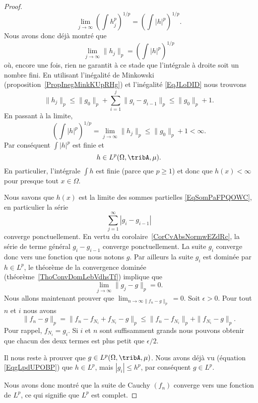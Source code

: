 \begin{proof}
	\begin{equation}
		\lim_{j\to \infty} \left( \int h_j^p \right)^{1/p}=\left( \int | h |^p \right)^{1/p}.
	\end{equation}
	Nous avons donc déjà montré que
	\begin{equation}
		\lim_{j\to \infty} \| h_j \|_p=\left( \int | h |^p \right)^{1/p}
	\end{equation}
	où, encore une fois, rien ne garantit à ce stade que l'intégrale à droite soit un nombre fini. En utilisant l'inégalité de Minkowski (proposition~\ref{PropInegMinkKUpRHg}) et l'inégalité \eqref{EqJLoDID} nous trouvons
	\begin{equation}
		\|h_j\|_p\leq \|g_0\|_p+\sum_{i=1}^j\|g_i-g_{i-1}\|_p\leq \|g_0\|_p+1.
	\end{equation}
	En passant à la limite,
	\begin{equation}
		\left( \int| h |^p \right)^{1/p}=\lim_{j\to \infty}\|h_j\|_p \leq \|g_0\|_p+1<\infty.
	\end{equation}
	Par conséquent \( \int| h |^p\) est finie et
	\begin{equation}    \label{EqgLpdUPOBP}
		h\in L^p(\Omega,\tribA,\mu).
	\end{equation}
	En particulier, l'intégrale \( \int h\) est finie (parce que \( p\geq 1\)) et donc que \( h(x)<\infty\) pour presque tout \( x\in\Omega\).

	Nous savons que \( h(x)\) est la limite des sommes partielles \eqref{EqSomPaFPQOWC}, en particulier la série
	\begin{equation}
		\sum_{j=1}^{\infty}| g_i-g_{i-1} |
	\end{equation}
	converge ponctuellement. En vertu du corolaire~\ref{CorCvAbsNormwEZdRc}, la série de terme général \( g_i-g_{i-1}\) converge ponctuellement. La suite \( g_i\) converge donc vers une fonction que nous notons \( g\). Par ailleurs la suite \( g_i\) est dominée par \( h\in L^p\), le théorème de la convergence dominée (théorème~\ref{ThoConvDomLebVdhsTf}) implique que
	\begin{equation}
		\lim_{j\to \infty} \|g_j-g\|_p=0.
	\end{equation}
	Nous allons maintenant prouver que \( \lim_{n\to \infty\|f_n-g\|_p} =0\). Soit \( \epsilon>0\). Pour tout \( n\) et \( i\) nous avons
	\begin{equation}
		\|f_n-g\|_p=\|f_n-f_{N_i}+f_{N_i}-g\|_p\leq\|f_n-f_{N_i}\|_p+\|f_{N_i}-g\|_p.
	\end{equation}
	Pour rappel, \( f_{N_i}=g_i\). Si \(i\) et \( n\) sont suffisamment grands nous pouvons obtenir que chacun des deux termes est plus petit que \( \epsilon/2\).

	Il nous reste à prouver que \( g\in L^p(\Omega,\tribA,\mu)\). Nous avons déjà vu (équation \eqref{EqgLpdUPOBP}) que \( h\in L^p\), mais \( | g_i |\leq h^p\), par conséquent  \( g\in L^p\).

	Nous avons donc montré que la suite de Cauchy \( (f_n)\) converge vers une fonction de \( L^p\), ce qui signifie que \( L^p\) est complet.
\end{proof}

